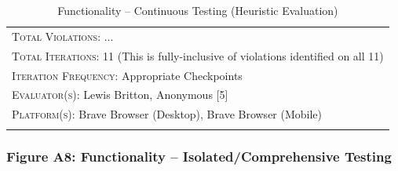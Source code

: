 \documentclass[11pt, english]{article}
\begin{document}
\begin{center}
\begin{longtable}{p{7.5cm}p{0.5cm}p{0.5cm}p{4cm}}
		\hline
                \multicolumn{4}{l}{\textsc{Total Violations}: ...}\\
                \multicolumn{4}{l}{\textsc{Total Iterations}: 11 (This is fully-inclusive of violations identified on all 11)}\\
		\multicolumn{4}{l}{\textsc{Iteration Frequency}: Appropriate Checkpoints}\\
		\multicolumn{4}{l}{\textsc{Evaluator(s)}: Lewis Britton, Anonymous [5]}\\
                \multicolumn{4}{l}{\textsc{Platform(s)}: Brave Browser (Desktop), Brave Browser (Mobile)}\\
                \hline
                \caption{Functionality -- Continuous Testing (Heuristic Evaluation)}
        \end{longtable}
        \end{center}

\newpage

		\subsubsection*{Figure A8: Functionality -- Isolated/Comprehensive Testing}
\end{document}
